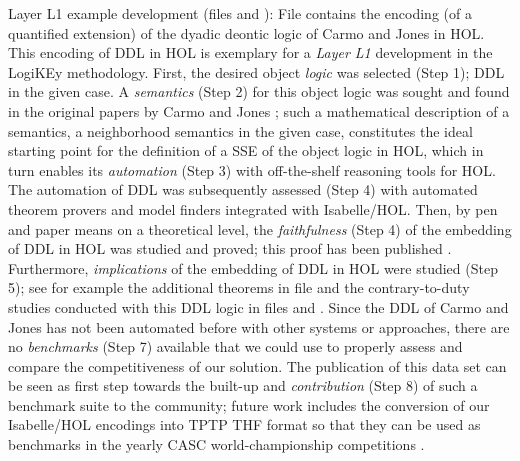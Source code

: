 \documentclass{article}
\begin{document}
\begin{description}
\item{Layer L1 example development (files \textsf{\small {}} and
    \textsf{\small {}}):} 
  File \textsf{\small {}} contains the encoding (of a quantified extension) of the dyadic
  deontic logic of Carmo and Jones in HOL. This encoding of DDL in HOL
  is exemplary for a \textit{Layer L1} development in the LogiKEy
  methodology. First, the desired object \textit{logic} was selected
  (Step 1); DDL in the given case. A \textit{semantics} (Step 2) for
  this object logic was sought and found in the original papers by
  Carmo and Jones \cite{Carmo2002,CJ13}; such a mathematical
  description of a semantics, a neighborhood semantics in the given
  case, constitutes the ideal starting point for the definition of a
  SSE of the object logic in HOL, which in turn enables its
  \textit{automation} (Step 3) with off-the-shelf reasoning tools for
  HOL. The automation of DDL was subsequently assessed (Step 4) with
  automated theorem provers and model finders integrated with
  Isabelle/HOL. Then, by pen and paper means on a theoretical level,
  the \textit{faithfulness} (Step 4) of the embedding of DDL in HOL
  was studied and proved; this proof has been published
  \cite{C71,R63}. Furthermore, \textit{implications} of the embedding
  of DDL in HOL were studied (Step 5); see for example the additional
  theorems in file \textsf{\small {}}
  and the contrary-to-duty studies conducted with this DDL logic in
  files \textsf{\small {}} and
  \textsf{\small {}}. Since the DDL
  of Carmo and Jones has not been automated before with other systems
  or approaches, there are no \textit{benchmarks} (Step 7) available
  that we could use to properly assess and compare the
  competitiveness of our solution. The publication of this data set
  can be seen as first step towards the built-up and \textit{contribution} (Step 8)
  of such a benchmark suite to the community; future work includes the
  conversion of our Isabelle/HOL encodings into TPTP THF format
  \cite{J22} so that they can be used as benchmarks in the yearly CASC
  world-championship competitions \cite{DBLP:journals/aim/Sutcliffe16}.


\end{description}
\end{document}
